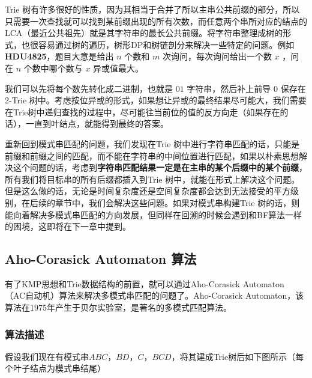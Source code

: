 \documentclass[UTF8]{ctexart}
\begin{document}
Trie 树有许多很好的性质，因为其相当于合并了所以主串公共前缀的部分，所以只需要一次查找就可以找到某前缀出现的所有次数，而任意两个串所对应的结点的LCA（最近公共祖先）就是其字符串的最长公共前缀。将字符串整理成树的形式，也很容易通过树的遍历，树形DP和树链剖分来解决一些特定的问题。例如\textbf{HDU4825}，题目大意是给出 $n$ 个数和 $m$ 次询问，每次询问给出一个数 $x$ ，问在 $n$ 个数中哪个数与 $x$ 异或值最大。

我们可以先将每个数先转化成二进制，也就是 $01$ 字符串，然后补上前导 $0$ 保存在2-Trie 树中。考虑按位异或的形式，如果想让异或的最终结果尽可能大，我们需要在Trie树中递归查找的过程中，尽可能往当前位的值的反方向走（如果存在的话），一直到叶结点，就能得到最终的答案。

重新回到模式串匹配的问题，我们发现在Trie 树中进行字符串匹配的话，只能是前缀和前缀之间的匹配，而不能在字符串的中间位置进行匹配，如果以朴素思想解决这个问题的话，考虑到\textbf{字符串匹配结果一定是在主串的某个后缀中的某个前缀}，所有我们将目标串的所有后缀都插入到Trie 树中，就能在形式上解决这个问题。但是这么做的话，无论是时间复杂度还是空间复杂度都会达到无法接受的平方级别，在后续的章节中，我们会解决这些问题。如果对模式串构建Trie 树的话，则能向着解决多模式串匹配的方向发展，但同样在回溯的时候会遇到和BF算法一样的困境，这即将在下一章中提到。

\subsection {Aho-Corasick Automaton 算法}

有了KMP思想和Trie数据结构的前置，就可以通过Aho-Corasick Automaton （AC自动机）算法来解决多模式串匹配的问题了。Aho-Corasick Automaton，该算法在1975年产生于贝尔实验室，是著名的多模式匹配算法。

\subsubsection {算法描述}

假设我们现在有模式串\textcolor[rgb]{1,0,0}{$ABC$}，\textcolor[rgb]{1,0,0}{$BD$}，\textcolor[rgb]{1,0,0}{$C$}，\textcolor[rgb]{1,0,0}{$BCD$}，将其建成Trie树后如下图所示（每个叶子结点为模式串结尾） \par

\end{document}
